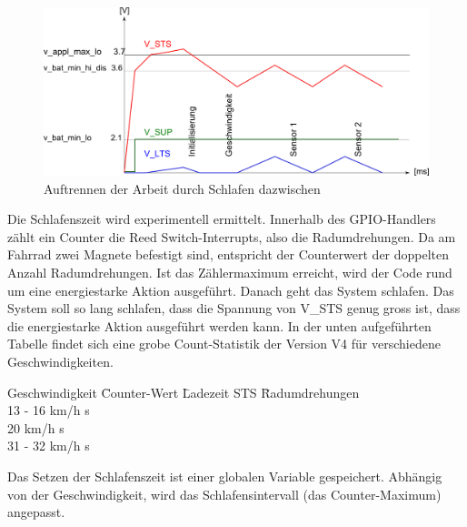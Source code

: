 \begin{figure}[ht]
  \includegraphics[width=1.0\textwidth]{3Vorgehen/imag/HIGH_ENERGY.png}
  \caption{Auftrennen der Arbeit durch Schlafen dazwischen}
  \label{schnarch}
\end{figure}


Die Schlafenszeit wird experimentell ermittelt. Innerhalb des GPIO-Handlers zählt ein Counter die Reed Switch-Interrupts, also die Radumdrehungen. Da am Fahrrad zwei Magnete befestigt sind, entspricht der Counterwert der doppelten Anzahl Radumdrehungen. Ist  das Zählermaximum erreicht, wird der Code rund um eine energiestarke Aktion ausgeführt. Danach geht das System schlafen. Das System soll so lang schlafen, dass die Spannung von V\_STS genug gross ist, dass die energiestarke Aktion ausgeführt werden kann. In der unten aufgeführten Tabelle findet sich eine grobe Count-Statistik der Version V4 für verschiedene Geschwindigkeiten. 

\begin{minipage}{\textwidth}
    \begin{tabbing}
   Geschwindigkeit \quad\= Counter-Wert  \quad\= Ladezeit STS    \quad\= Radumdrehungen\\[0.8ex]
   13 - 16 km/h                          s    \\
   20 km/h                                s    \\
   31 - 32 km/h                           s    \\    
    \end{tabbing}
\end{minipage}

Das Setzen der Schlafenszeit ist einer globalen Variable gespeichert. Abhängig von der Geschwindigkeit, wird das Schlafensintervall (das Counter-Maximum) angepasst.







